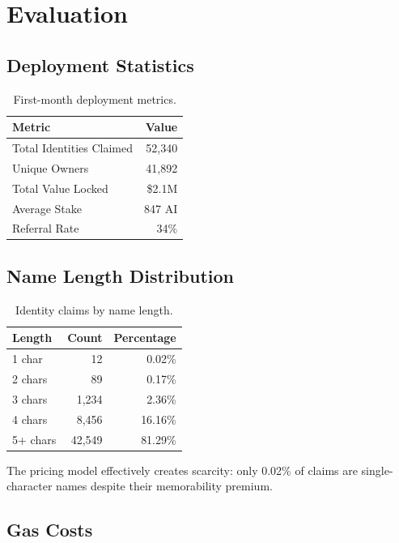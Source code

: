 \section{Evaluation}


\subsection{Deployment Statistics}

\begin{table}[h]
\centering
\caption{First-month deployment metrics.}
\label{tab:deployment}
\begin{tabular}{lr}
\toprule
\textbf{Metric} & \textbf{Value} \\
\midrule
Total Identities Claimed & 52,340 \\
Unique Owners & 41,892 \\
Total Value Locked & \$2.1M \\
Average Stake & 847 AI \\
Referral Rate & 34\% \\
\bottomrule
\end{tabular}
\end{table}

\subsection{Name Length Distribution}

\begin{table}[h]
\centering
\caption{Identity claims by name length.}
\label{tab:length}
\begin{tabular}{lrr}
\toprule
\textbf{Length} & \textbf{Count} & \textbf{Percentage} \\
\midrule
1 char & 12 & 0.02\% \\
2 chars & 89 & 0.17\% \\
3 chars & 1,234 & 2.36\% \\
4 chars & 8,456 & 16.16\% \\
5+ chars & 42,549 & 81.29\% \\
\bottomrule
\end{tabular}
\end{table}

The pricing model effectively creates scarcity: only 0.02\% of claims are single-character names despite their memorability premium.

\subsection{Gas Costs}

